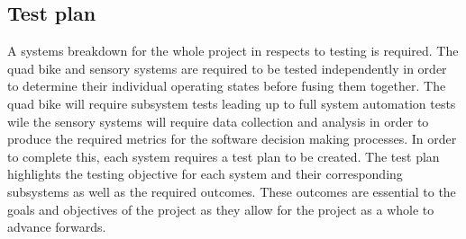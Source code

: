 \documentclass[main.tex]{subfiles}
\begin{document}
\begin{appendices}






\section{Test plan}
A systems breakdown for the whole project in respects to testing is required. The quad bike and sensory systems are required to be tested independently in order to determine their individual operating states before fusing them together. The quad bike will require subsystem tests leading up to full system automation tests wile the sensory systems will require data collection and analysis in order to produce the required metrics for the software decision making processes. In order to complete this, each system requires a test plan to be created. The test plan highlights the testing objective for each system and their corresponding subsystems as well as the required outcomes. These outcomes are essential to the goals and objectives of the project as they allow for the project as a whole to advance forwards.


\end{appendices}
\end{document}
